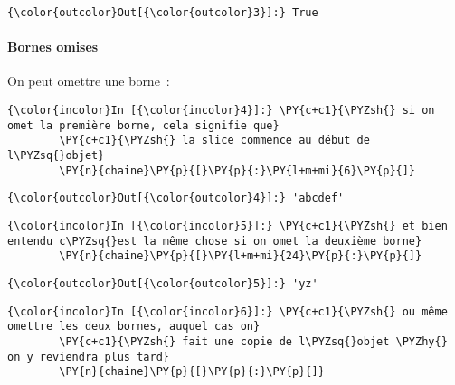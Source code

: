 \begin{Verbatim}[commandchars=\\\{\},frame=single,framerule=0.3mm,rulecolor=\color{cellframecolor}]
{\color{outcolor}Out[{\color{outcolor}3}]:} True
\end{Verbatim}
            
    \hypertarget{bornes-omises}{%
\paragraph{Bornes omises}\label{bornes-omises}}

    On peut omettre une borne~:

    \begin{Verbatim}[commandchars=\\\{\},frame=single,framerule=0.3mm,rulecolor=\color{cellframecolor}]
{\color{incolor}In [{\color{incolor}4}]:} \PY{c+c1}{\PYZsh{} si on omet la première borne, cela signifie que}
        \PY{c+c1}{\PYZsh{} la slice commence au début de l\PYZsq{}objet}
        \PY{n}{chaine}\PY{p}{[}\PY{p}{:}\PY{l+m+mi}{6}\PY{p}{]}
\end{Verbatim}


\begin{Verbatim}[commandchars=\\\{\},frame=single,framerule=0.3mm,rulecolor=\color{cellframecolor}]
{\color{outcolor}Out[{\color{outcolor}4}]:} 'abcdef'
\end{Verbatim}
            
    \begin{Verbatim}[commandchars=\\\{\},frame=single,framerule=0.3mm,rulecolor=\color{cellframecolor}]
{\color{incolor}In [{\color{incolor}5}]:} \PY{c+c1}{\PYZsh{} et bien entendu c\PYZsq{}est la même chose si on omet la deuxième borne}
        \PY{n}{chaine}\PY{p}{[}\PY{l+m+mi}{24}\PY{p}{:}\PY{p}{]}
\end{Verbatim}


\begin{Verbatim}[commandchars=\\\{\},frame=single,framerule=0.3mm,rulecolor=\color{cellframecolor}]
{\color{outcolor}Out[{\color{outcolor}5}]:} 'yz'
\end{Verbatim}
            
    \begin{Verbatim}[commandchars=\\\{\},frame=single,framerule=0.3mm,rulecolor=\color{cellframecolor}]
{\color{incolor}In [{\color{incolor}6}]:} \PY{c+c1}{\PYZsh{} ou même omettre les deux bornes, auquel cas on}
        \PY{c+c1}{\PYZsh{} fait une copie de l\PYZsq{}objet \PYZhy{} on y reviendra plus tard}
        \PY{n}{chaine}\PY{p}{[}\PY{p}{:}\PY{p}{]}
\end{Verbatim}


